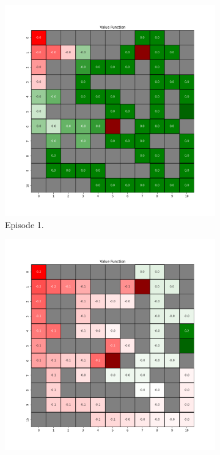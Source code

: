 \documentclass{assignment}
\begin{document}
\begin{figure}[H]
    \begin{subfigure}{0.3\textwidth}
        \includegraphics[width=\textwidth]{figures/value_q/alpha_sweep/value_function_alpha_0.001_gamma_0.95_epsilon_0.2_iteration_1.png}
    \caption{Episode 1.}
    \end{subfigure}\hfill
    \begin{subfigure}{0.3\textwidth}
        \includegraphics[width=\textwidth]{figures/value_q/alpha_sweep/value_function_alpha_0.001_gamma_0.95_epsilon_0.2_iteration_50.png}

\end{subfigure}
\end{figure}
\end{document}
